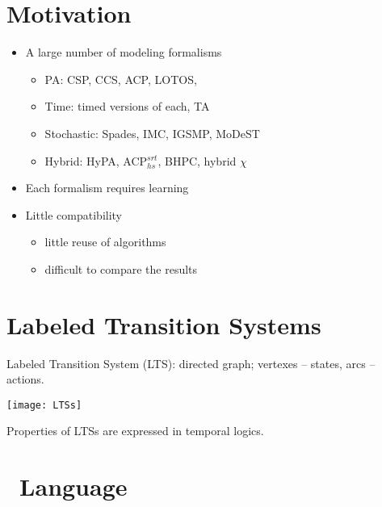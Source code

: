 \begin{slide}
\phantom{}
\vspace{3ex}

\maketitle

\newslide\section*{Motivation}
\begin{itemize}
\item A large number of modeling formalisms
  \begin{itemize}
  \item PA: CSP, CCS, ACP, LOTOS, \mcrl
  \item Time: timed versions of each, TA
  \item Stochastic: Spades, IMC, IGSMP, MoDeST
  \item Hybrid: HyPA, ACP$^{srt}_{hs}$, BHPC, hybrid $\chi$
  \end{itemize}
\item Each formalism requires learning
\item Little compatibility
  \begin{itemize}
  \item little reuse of algorithms
  \item difficult to compare the results
  \end{itemize}
\end{itemize}
\newslide\section*{Labeled Transition Systems}
Labeled Transition System (LTS): directed graph;
vertexes -- states, arcs -- actions.
\pause
\begin{center}
\texttt{[image: LTSs]}
\end{center}
\pause
Properties of LTSs are expressed in temporal logics.
\newslide\section*{\mcrl\ Language}

\end{slide}
